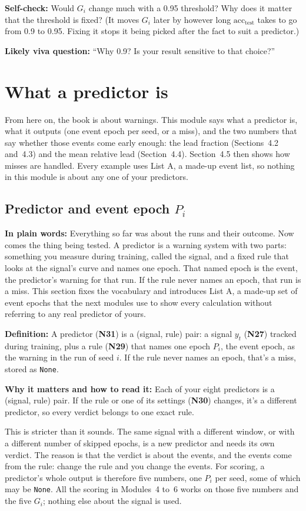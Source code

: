 \documentclass[11pt,a4paper,oneside,openany]{report}
\newcommand{\acctest}{\mathrm{acc}_{\mathrm{test}}}
\newcommand{\None}{\texttt{None}}
\newcommand{\gl}[1]{\textbf{#1}}   %
\newcommand{\fplain}{\textbf{In plain words:} }
\newcommand{\fdef}{\textbf{Definition:} }
\newcommand{\fread}{\par\textbf{Why it matters and how to read it:} }
\newcommand{\fself}{\par\textbf{Self-check:} }
\newcommand{\fviva}{\par\textbf{Likely viva question:} }
\begin{document}
\fself Would $G_i$ change much with a 0.95 threshold? Why does it matter that the threshold is fixed? (It moves $G_i$ later by however long $\acctest$ takes to go from 0.9 to 0.95. Fixing it stops it being picked after the fact to suit a predictor.)
\fviva ``Why 0.9? Is your result sensitive to that choice?''
\chapter{What a predictor is}

From here on, the book is about warnings. This module says what a predictor is, what it outputs (one event epoch per seed, or a miss), and the two numbers that say whether those events come early enough: the lead fraction (Sections~4.2 and~4.3) and the mean relative lead (Section~4.4). Section~4.5 then shows how misses are handled. Every example uses List A, a made-up event list, so nothing in this module is about any one of your predictors.

\section{Predictor and event epoch $P_i$}
\fplain Everything so far was about the runs and their outcome. Now comes the thing being tested. A predictor is a warning system with two parts: something you measure during training, called the signal, and a fixed rule that looks at the signal's curve and names one epoch. That named epoch is the event, the predictor's warning for that run. If the rule never names an epoch, that run is a miss. This section fixes the vocabulary and introduces List A, a made-up set of event epochs that the next modules use to show every calculation without referring to any real predictor of yours.

\fdef A predictor (\gl{N31}) is a (signal, rule) pair: a signal $y_t$ (\gl{N27}) tracked during training, plus a rule (\gl{N29}) that names one epoch $P_i$, the event epoch, as the warning in the run of seed $i$. If the rule never names an epoch, that's a miss, stored as \None.
\fread Each of your eight predictors is a (signal, rule) pair. If the rule or one of its settings (\gl{N30}) changes, it's a different predictor, so every verdict belongs to one exact rule.

This is stricter than it sounds. The same signal with a different window, or with a different number of skipped epochs, is a new predictor and needs its own verdict. The reason is that the verdict is about the events, and the events come from the rule: change the rule and you change the events. For scoring, a predictor's whole output is therefore five numbers, one $P_i$ per seed, some of which may be \None. All the scoring in Modules~4 to~6 works on those five numbers and the five $G_i$; nothing else about the signal is used.
\end{document}
